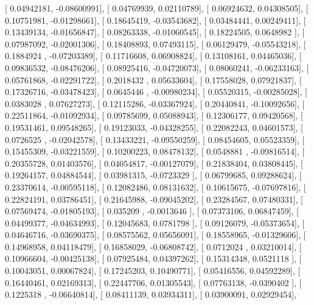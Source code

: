 \documentclass{article}
\begin{document}
       [ 0.04942181, -0.08600991],
       [ 0.04769939,  0.02110789],
       [ 0.06924632,  0.04308505],
       [ 0.10751981, -0.01298661],
       [ 0.18645419, -0.03543682],
       [ 0.03484441,  0.00249411],
       [ 0.13439134, -0.01656847],
       [ 0.08263338, -0.01060545],
       [ 0.18224505,  0.0648982 ],
       [ 0.07987092, -0.02001306],
       [ 0.18408893,  0.07493115],
       [ 0.06129479, -0.05543218],
       [ 0.1884924 , -0.07203389],
       [ 0.11716608,  0.06908824],
       [ 0.13108161,  0.04465036],
       [ 0.09836532, -0.08476206],
       [ 0.08925416, -0.04720073],
       [ 0.08060241, -0.06233163],
       [ 0.05761868, -0.02291722],
       [ 0.2018432 ,  0.05633604],
       [ 0.17558028,  0.07921837],
       [ 0.17326716, -0.03478423],
       [ 0.0645446 , -0.00980234],
       [ 0.05520315, -0.00285028],
       [ 0.0383028 ,  0.07627273],
       [ 0.12115286, -0.03367924],
       [ 0.20440841, -0.10092656],
       [ 0.22511864, -0.01092934],
       [ 0.09785699,  0.05088943],
       [ 0.12306177,  0.09420568],
       [ 0.19531461,  0.09548265],
       [ 0.19123033, -0.04328255],
       [ 0.22082243,  0.04601573],
       [ 0.0726525 , -0.02042578],
       [ 0.13433221, -0.09550259],
       [ 0.08454605,  0.05523359],
       [ 0.15455309, -0.03221559],
       [ 0.10200223,  0.08478132],
       [ 0.0548881 , -0.09816514],
       [ 0.20355728,  0.01403576],
       [ 0.04054817, -0.00127079],
       [ 0.21838404,  0.03808445],
       [ 0.19264157,  0.04884544],
       [ 0.03981315, -0.0723329 ],
       [ 0.06799685,  0.09288624],
       [ 0.23370614, -0.00595118],
       [ 0.12082486,  0.08131632],
       [ 0.10615675, -0.07697816],
       [ 0.22824191,  0.03786451],
       [ 0.21645988, -0.09045202],
       [ 0.23284567,  0.07480331],
       [ 0.07569474, -0.01805193],
       [ 0.035209  , -0.0013646 ],
       [ 0.07373106,  0.06847459],
       [ 0.04499377, -0.04634993],
       [ 0.12045683,  0.0781798 ],
       [ 0.09126079, -0.05373654],
       [ 0.04646716, -0.03690375],
       [ 0.08575562,  0.05656091],
       [ 0.18558965, -0.01329606],
       [ 0.14968958,  0.04118479],
       [ 0.16858029, -0.06808742],
       [ 0.0712024 ,  0.03210014],
       [ 0.10966604, -0.00425138],
       [ 0.07925484,  0.04397262],
       [ 0.15314348,  0.0521118 ],
       [ 0.10043051,  0.00067824],
       [ 0.17245203,  0.10490771],
       [ 0.05416556,  0.04592289],
       [ 0.16440461,  0.02169313],
       [ 0.22447706,  0.01305543],
       [ 0.07763138, -0.0390402 ],
       [ 0.1225318 , -0.06640814],
       [ 0.08411139,  0.03934311],
       [ 0.03900091,  0.02929454],
\end{document}
